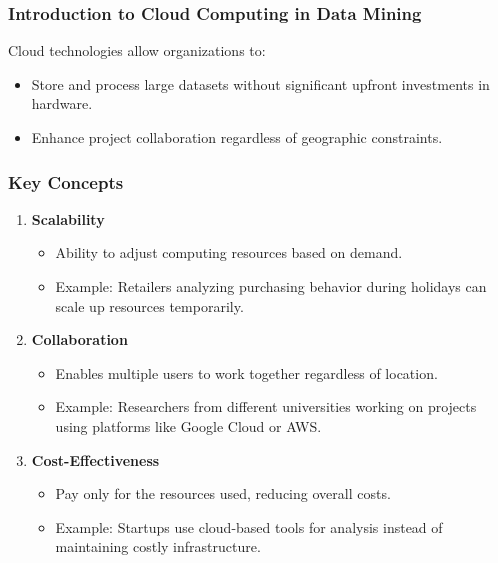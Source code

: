 \documentclass{beamer}
\begin{document}
\begin{frame}[fragile]
    \frametitle{Introduction to Cloud Computing in Data Mining}
    Cloud technologies allow organizations to:
    \begin{itemize}
        \item Store and process large datasets without significant upfront investments in hardware.
        \item Enhance project collaboration regardless of geographic constraints.
    \end{itemize}
\end{frame}

\begin{frame}[fragile]
    \frametitle{Key Concepts}
    \begin{enumerate}
        \item \textbf{Scalability}
            \begin{itemize}
                \item Ability to adjust computing resources based on demand.
                \item Example: Retailers analyzing purchasing behavior during holidays can scale up resources temporarily.
            \end{itemize}

        \item \textbf{Collaboration}
            \begin{itemize}
                \item Enables multiple users to work together regardless of location.
                \item Example: Researchers from different universities working on projects using platforms like Google Cloud or AWS.
            \end{itemize}

        \item \textbf{Cost-Effectiveness}
            \begin{itemize}
                \item Pay only for the resources used, reducing overall costs.
                \item Example: Startups use cloud-based tools for analysis instead of maintaining costly infrastructure.
            \end{itemize}
    \end{enumerate}
\end{frame}
\end{document}

